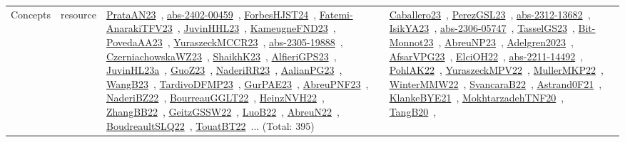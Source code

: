 {\begin{longtable}{lp{3cm}>{\raggedright\arraybackslash}p{6cm}>{\raggedright\arraybackslash}p{6cm}>{\raggedright\arraybackslash}p{8cm}}
Concepts & resource & \href{works/PrataAN23.pdf}{PrataAN23}~\cite{PrataAN23}, \href{works/abs-2402-00459.pdf}{abs-2402-00459}~\cite{abs-2402-00459}, \href{works/ForbesHJST24.pdf}{ForbesHJST24}~\cite{ForbesHJST24}, \href{works/Fatemi-AnarakiTFV23.pdf}{Fatemi-AnarakiTFV23}~\cite{Fatemi-AnarakiTFV23}, \href{works/JuvinHHL23.pdf}{JuvinHHL23}~\cite{JuvinHHL23}, \href{works/KameugneFND23.pdf}{KameugneFND23}~\cite{KameugneFND23}, \href{works/PovedaAA23.pdf}{PovedaAA23}~\cite{PovedaAA23}, \href{works/YuraszeckMCCR23.pdf}{YuraszeckMCCR23}~\cite{YuraszeckMCCR23}, \href{works/abs-2305-19888.pdf}{abs-2305-19888}~\cite{abs-2305-19888}, \href{works/CzerniachowskaWZ23.pdf}{CzerniachowskaWZ23}~\cite{CzerniachowskaWZ23}, \href{works/ShaikhK23.pdf}{ShaikhK23}~\cite{ShaikhK23}, \href{works/AlfieriGPS23.pdf}{AlfieriGPS23}~\cite{AlfieriGPS23}, \href{works/JuvinHL23a.pdf}{JuvinHL23a}~\cite{JuvinHL23a}, \href{works/GuoZ23.pdf}{GuoZ23}~\cite{GuoZ23}, \href{works/NaderiRR23.pdf}{NaderiRR23}~\cite{NaderiRR23}, \href{works/AalianPG23.pdf}{AalianPG23}~\cite{AalianPG23}, \href{works/WangB23.pdf}{WangB23}~\cite{WangB23}, \href{works/TardivoDFMP23.pdf}{TardivoDFMP23}~\cite{TardivoDFMP23}, \href{works/GurPAE23.pdf}{GurPAE23}~\cite{GurPAE23}, \href{works/AbreuPNF23.pdf}{AbreuPNF23}~\cite{AbreuPNF23}, \href{works/NaderiBZ22.pdf}{NaderiBZ22}~\cite{NaderiBZ22}, \href{works/BourreauGGLT22.pdf}{BourreauGGLT22}~\cite{BourreauGGLT22}, \href{works/HeinzNVH22.pdf}{HeinzNVH22}~\cite{HeinzNVH22}, \href{works/ZhangBB22.pdf}{ZhangBB22}~\cite{ZhangBB22}, \href{works/GeitzGSSW22.pdf}{GeitzGSSW22}~\cite{GeitzGSSW22}, \href{works/LuoB22.pdf}{LuoB22}~\cite{LuoB22}, \href{works/AbreuN22.pdf}{AbreuN22}~\cite{AbreuN22}, \href{works/BoudreaultSLQ22.pdf}{BoudreaultSLQ22}~\cite{BoudreaultSLQ22}, \href{works/TouatBT22.pdf}{TouatBT22}~\cite{TouatBT22}... (Total: 395) & \href{works/Caballero23.pdf}{Caballero23}~\cite{Caballero23}, \href{works/PerezGSL23.pdf}{PerezGSL23}~\cite{PerezGSL23}, \href{works/abs-2312-13682.pdf}{abs-2312-13682}~\cite{abs-2312-13682}, \href{works/IsikYA23.pdf}{IsikYA23}~\cite{IsikYA23}, \href{works/abs-2306-05747.pdf}{abs-2306-05747}~\cite{abs-2306-05747}, \href{works/TasselGS23.pdf}{TasselGS23}~\cite{TasselGS23}, \href{works/Bit-Monnot23.pdf}{Bit-Monnot23}~\cite{Bit-Monnot23}, \href{works/AbreuNP23.pdf}{AbreuNP23}~\cite{AbreuNP23}, \href{works/Adelgren2023.pdf}{Adelgren2023}~\cite{Adelgren2023}, \href{works/AfsarVPG23.pdf}{AfsarVPG23}~\cite{AfsarVPG23}, \href{works/ElciOH22.pdf}{ElciOH22}~\cite{ElciOH22}, \href{works/abs-2211-14492.pdf}{abs-2211-14492}~\cite{abs-2211-14492}, \href{works/PohlAK22.pdf}{PohlAK22}~\cite{PohlAK22}, \href{works/YuraszeckMPV22.pdf}{YuraszeckMPV22}~\cite{YuraszeckMPV22}, \href{works/MullerMKP22.pdf}{MullerMKP22}~\cite{MullerMKP22}, \href{works/WinterMMW22.pdf}{WinterMMW22}~\cite{WinterMMW22}, \href{works/SvancaraB22.pdf}{SvancaraB22}~\cite{SvancaraB22}, \href{works/Astrand0F21.pdf}{Astrand0F21}~\cite{Astrand0F21}, \href{works/KlankeBYE21.pdf}{KlankeBYE21}~\cite{KlankeBYE21}, \href{works/MokhtarzadehTNF20.pdf}{MokhtarzadehTNF20}~\cite{MokhtarzadehTNF20}, \href{works/TangB20.pdf}{TangB20}~\cite{TangB20}, 
\end{longtable}}
